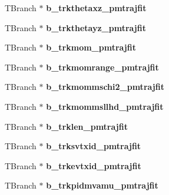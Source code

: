 \begin{DoxyCompactItemize}
\item 
\hypertarget{classanatree_a9606a4cfabbb7b0adfcef803d6db1131}{T\-Branch $\ast$ {\bfseries b\-\_\-trkthetaxz\-\_\-pmtrajfit}}\label{classanatree_a9606a4cfabbb7b0adfcef803d6db1131}

\item 
\hypertarget{classanatree_a219a796f1d82ae675f90bb95d61d9e65}{T\-Branch $\ast$ {\bfseries b\-\_\-trkthetayz\-\_\-pmtrajfit}}\label{classanatree_a219a796f1d82ae675f90bb95d61d9e65}

\item 
\hypertarget{classanatree_a781605818c6f79fcf0c72bb92e4afb45}{T\-Branch $\ast$ {\bfseries b\-\_\-trkmom\-\_\-pmtrajfit}}\label{classanatree_a781605818c6f79fcf0c72bb92e4afb45}

\item 
\hypertarget{classanatree_a430966eda9ee3cf3962961fe2bd6e1bc}{T\-Branch $\ast$ {\bfseries b\-\_\-trkmomrange\-\_\-pmtrajfit}}\label{classanatree_a430966eda9ee3cf3962961fe2bd6e1bc}

\item 
\hypertarget{classanatree_a557be6df8e770fb10e08bd2d01324af9}{T\-Branch $\ast$ {\bfseries b\-\_\-trkmommschi2\-\_\-pmtrajfit}}\label{classanatree_a557be6df8e770fb10e08bd2d01324af9}

\item 
\hypertarget{classanatree_ab136c765473d3eeaa83e913d1cf7a844}{T\-Branch $\ast$ {\bfseries b\-\_\-trkmommsllhd\-\_\-pmtrajfit}}\label{classanatree_ab136c765473d3eeaa83e913d1cf7a844}

\item 
\hypertarget{classanatree_a1184afcee9212f636e62a54a4adb7f3c}{T\-Branch $\ast$ {\bfseries b\-\_\-trklen\-\_\-pmtrajfit}}\label{classanatree_a1184afcee9212f636e62a54a4adb7f3c}

\item 
\hypertarget{classanatree_aefc586e24cd56120d09725a6de46a4ac}{T\-Branch $\ast$ {\bfseries b\-\_\-trksvtxid\-\_\-pmtrajfit}}\label{classanatree_aefc586e24cd56120d09725a6de46a4ac}

\item 
\hypertarget{classanatree_a2213c41f2c43fb483c8209689c99fc8c}{T\-Branch $\ast$ {\bfseries b\-\_\-trkevtxid\-\_\-pmtrajfit}}\label{classanatree_a2213c41f2c43fb483c8209689c99fc8c}

\item 
\hypertarget{classanatree_af25f24668d25368a9bf068a008a72021}{T\-Branch $\ast$ {\bfseries b\-\_\-trkpidmvamu\-\_\-pmtrajfit}}\label{classanatree_af25f24668d25368a9bf068a008a72021}


\end{DoxyCompactItemize}
